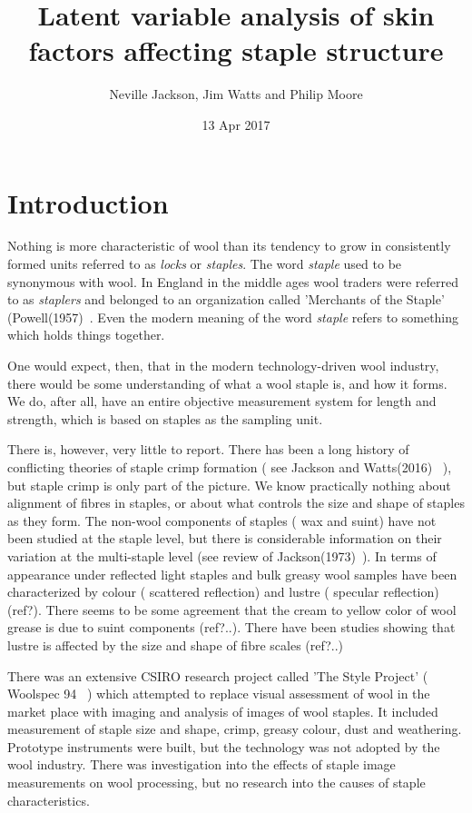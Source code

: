 \documentclass[titlepage]{article}  %
\title{Latent variable analysis of skin factors affecting staple structure}
\author{Neville Jackson,  Jim Watts and Philip Moore}
\date{13 Apr 2017}
\begin{document}
 
 
\maketitle      
\tableofcontents

\clearpage
\section{Introduction} 
Nothing is more characteristic of wool than its tendency to grow in consistently formed units referred to as {\em locks} or {\em staples}. The word {\em staple} used to be synonymous with wool. In England in the middle ages wool traders were referred to as  {\em staplers} and belonged to an organization called 'Merchants of the Staple' (Powell(1957)~\cite{powe:51}. Even the modern meaning of the word {\em staple} refers to something which holds things together.

One would expect, then,  that in the modern technology-driven wool industry, there would be some understanding of what a wool staple is, and how it forms. We do, after all, have an entire objective measurement system for length and strength, which is based on staples as the sampling unit.

There is, however, very little to report.  There has been a long history of conflicting theories of staple crimp formation ( see Jackson and Watts(2016)~\cite{jack:16} ), but staple crimp is only part of the picture. We know practically nothing about alignment of fibres in staples, or about what controls the size and shape of staples as they form.  The non-wool components of staples ( wax and suint) have not been studied at the staple level, but there is considerable information on their variation at the multi-staple level (see review of Jackson(1973)~\cite{jack:73}). In terms of appearance under reflected light staples  and bulk greasy wool samples have been characterized by colour ( scattered reflection) and lustre ( specular reflection) (ref?). There seems to be some agreement that the cream to yellow color of wool grease is due to suint components (ref?..). There have been studies showing that lustre is affected by the size and shape of fibre scales (ref?..)

There was an extensive CSIRO research project called 'The Style Project' ( Woolspec 94 ~\cite{wool:94}) which attempted to replace visual assessment of wool in the market place with imaging and analysis of images of wool staples.  It included measurement of staple size and shape, crimp, greasy colour, dust and weathering. Prototype instruments were built, but the technology was not adopted by the wool industry. There was investigation into the effects of staple image measurements on wool processing, but no research into the causes of staple characteristics.
\end{document}

